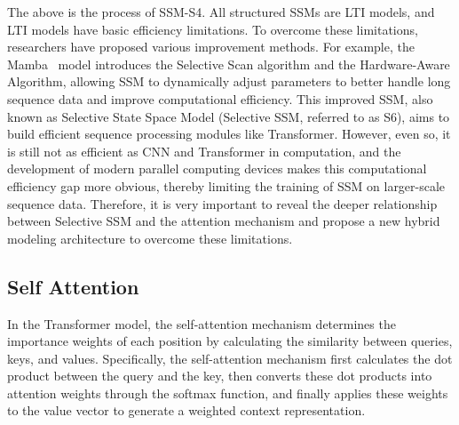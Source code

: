 \documentclass{article}
\theoremstyle{plain}
\theoremstyle{definition}
\theoremstyle{remark}
\begin{document}
The above is the process of SSM-S4. All structured SSMs are LTI models, and LTI models have basic efficiency limitations. To overcome these limitations, researchers have proposed various improvement methods. For example, the Mamba~\cite{mamba2} model introduces the Selective Scan algorithm and the Hardware-Aware Algorithm, allowing SSM to dynamically adjust parameters to better handle long sequence data and improve computational efficiency. This improved SSM, also known as Selective State Space Model (Selective SSM, referred to as S6), aims to build efficient sequence processing modules like Transformer. However, even so, it is still not as efficient as CNN and Transformer in computation, and the development of modern parallel computing devices makes this computational efficiency gap more obvious, thereby limiting the training of SSM on larger-scale sequence data. Therefore, it is very important to reveal the deeper relationship between Selective SSM and the attention mechanism and propose a new hybrid modeling architecture to overcome these limitations.


\subsection{Self Attention}
In the Transformer model, the self-attention mechanism determines the importance weights of each position by calculating the similarity between queries, keys, and values. Specifically, the self-attention mechanism first calculates the dot product between the query and the key, then converts these dot products into attention weights through the softmax function, and finally applies these weights to the value vector to generate a weighted context representation.
\end{document}
